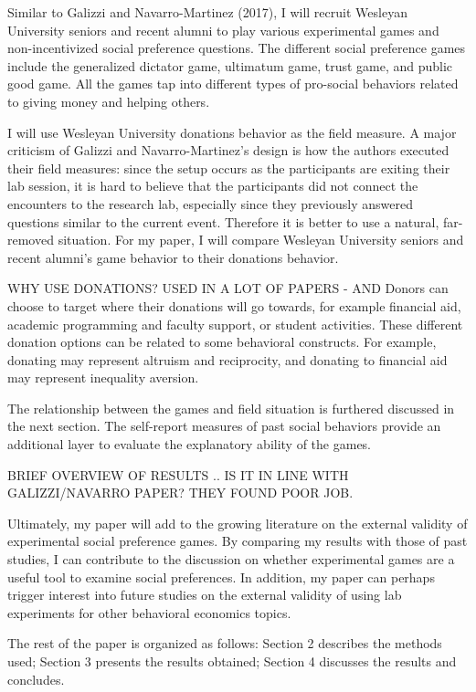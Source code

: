 \documentclass{article}
\begin{document}
Similar to Galizzi and Navarro-Martinez (2017), I will recruit Wesleyan University seniors and recent alumni to play various experimental games and non-incentivized social preference questions.  The different social preference games include the generalized dictator game, ultimatum game, trust game, and public good game. All the games { \color{red} tap into different types of pro-social behaviors related to giving money and helping others. }


I will use Wesleyan University donations behavior as the field measure. A major criticism of Galizzi and Navarro-Martinez\rq s design is how the authors executed their field measures: since the setup occurs as the participants are exiting their lab session, it is hard to believe that the participants did not connect the encounters to the research lab, especially since they previously answered questions similar to the current event. Therefore it is better to use a natural, far-removed situation. { \color{blue} For my paper, I will compare Wesleyan University seniors and recent alumni\rq s game behavior to their donations behavior. }

{ \color{red}WHY USE DONATIONS? USED IN A LOT OF PAPERS - AND Donors can choose to target where their donations will go towards, for example financial aid, academic programming and faculty support, or student activities. These different donation options can be related to some behavioral constructs. For example, donating may represent altruism and reciprocity, and donating to financial aid may represent inequality aversion. }

{ \color{blue} The relationship between the games and field situation is furthered discussed in the next section. The self-report measures of past social behaviors provide an additional layer to evaluate the explanatory ability of the games. }

{\color{red} BRIEF OVERVIEW OF RESULTS .. IS IT IN LINE WITH GALIZZI/NAVARRO PAPER? THEY FOUND POOR JOB. }

{\color{green} Ultimately, my paper will add to the growing literature on the external validity of experimental social preference games. By comparing my results with those of past studies, I can contribute to the discussion on whether experimental games are a useful tool to examine social preferences. In addition, my paper can perhaps trigger interest into future studies on the external validity of using lab experiments for other behavioral economics topics. }

The rest of the paper is organized as follows: Section 2 describes the methods used; Section 3 presents the results obtained; Section 4 discusses the results and concludes.
\end{document}

